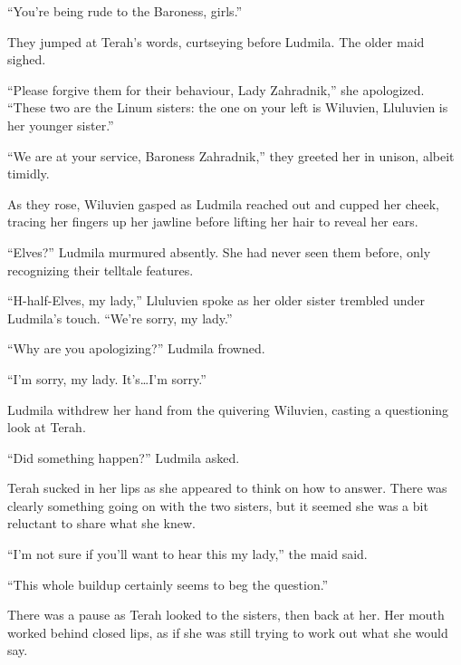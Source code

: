  

“You’re being rude to the Baroness, girls.”

 

They jumped at Terah’s words, curtseying before Ludmila. The older maid sighed.

 

“Please forgive them for their behaviour, Lady Zahradnik,” she apologized. “These two are the Linum sisters: the one on your left is Wiluvien, Lluluvien is her younger sister.”

 

“We are at your service, Baroness Zahradnik,” they greeted her in unison, albeit timidly.

 

As they rose, Wiluvien gasped as Ludmila reached out and cupped her cheek, tracing her fingers up her jawline before lifting her hair to reveal her ears.

 

“Elves?” Ludmila murmured absently. She had never seen them before, only recognizing their telltale features.

 

“H-half-Elves, my lady,” Lluluvien spoke as her older sister trembled under Ludmila's touch. “We’re sorry, my lady.”

 

“Why are you apologizing?” Ludmila frowned.

 

“I’m sorry, my lady. It’s…I’m sorry.”

 

Ludmila withdrew her hand from the quivering Wiluvien, casting a questioning look at Terah.

 

“Did something happen?” Ludmila asked.

 

Terah sucked in her lips as she appeared to think on how to answer. There was clearly something going on with the two sisters, but it seemed she was a bit reluctant to share what she knew.

 

“I’m not sure if you’ll want to hear this my lady,” the maid said.

 

“This whole buildup certainly seems to beg the question.”

 

There was a pause as Terah looked to the sisters, then back at her. Her mouth worked behind closed lips, as if she was still trying to work out what she would say.

